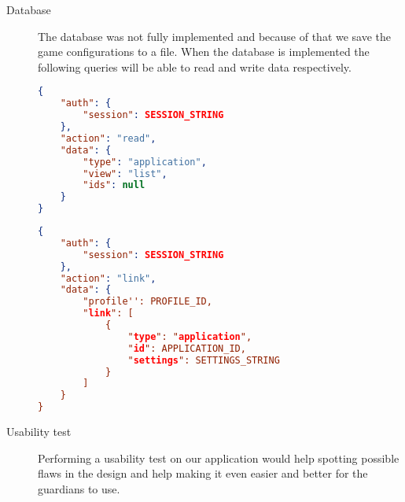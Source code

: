 \begin{description}
\item[Database] The database was not fully implemented and because of that we save the game configurations to a file. When the database is implemented the following queries will be able to read and write data respectively.
\begin{lstlisting}[language=json,firstnumber=1,caption={JSON query to read application data.},label=lst:jsonread]
{
    "auth": {
        "session": SESSION_STRING
    },
    "action": "read",
    "data": {
        "type": "application",
        "view": "list",
        "ids": null
    }
}
\end{lstlisting}

\begin{lstlisting}[language=json,firstnumber=1,caption={JSON query to write application data.},label=lst:jsonwrite]
{
    "auth": {
        "session": SESSION_STRING
    },
    "action": "link",
    "data": {
        "profile'': PROFILE_ID,
        "link": [
            {
                "type": "application",
                "id": APPLICATION_ID,
                "settings": SETTINGS_STRING
            }
        ]
    }
}
\end{lstlisting}

\item[Usability test] Performing a usability test on our application would help spotting possible flaws in the design and help making it even easier and better for the guardians to use. 

\end{description}
